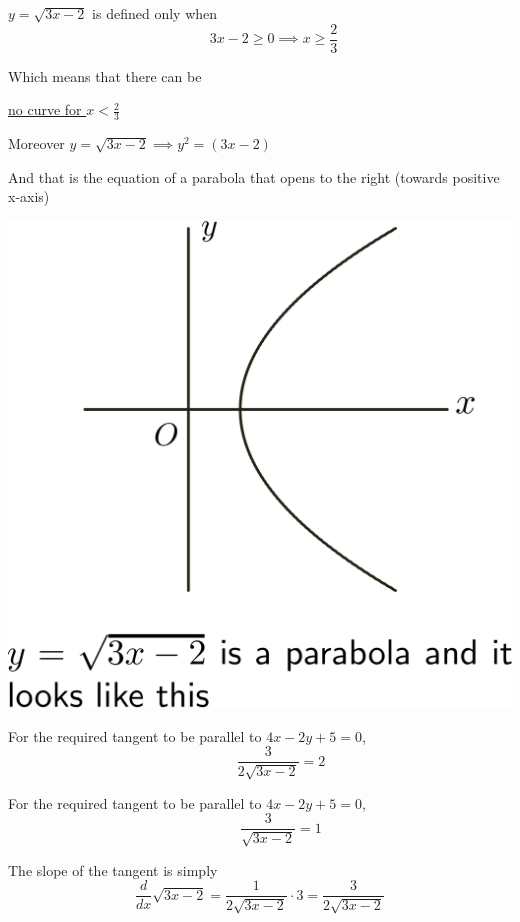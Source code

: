 \documentclass[14pt,fleqn]{extarticle}
\begin{document}
\newcard 

$y= \sqrt{3x-2}$ is defined only when 
\[ \qquad 3x - 2 \geq 0 \implies x \geq \frac{2}{3}\]

Which means that there can be 

\underline{no curve for $x < \frac{2}{3}$} \newline 

Moreover $y = \sqrt{3x-2} \implies y^2 = \left(3x-2 \right)$ \newline 

And that is the equation of a parabola that opens to the right (towards positive x-axis) 

\begin{center}
\includegraphics[scale=0.25]{r-1.svg} 
\end{center} 

\newcard 

For the required tangent to be parallel to $4x-2y+5=0$, 
\[ \quad \qquad \frac{3}{2\sqrt{3x-2}} = 2 \]

\newcard 

For the required tangent to be parallel to $4x-2y+5=0$, 
\[ \quad \qquad \frac{3}{\sqrt{3x-2}} = 1 \]


\newcard 

The slope of the tangent is simply 
\[\frac{d}{dx}\sqrt{3x- 2} = \frac{1}{2\sqrt{3x-2}}\cdot 3 = \frac{3}{2\sqrt{3x-2}} \]
\end{document}
